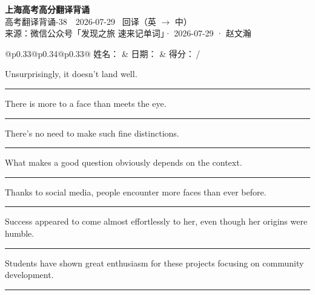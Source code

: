 \documentclass[11pt,a4paper]{article}
\newcommand{\num}[1]{\makebox[1.9em][r]{#1.}\hspace{0.3em}}
\newcommand{\wline}{\noindent\rule{\linewidth}{0.4pt}}
\begin{document}
\pagestyle{plain}
\begin{center}
{\LARGE\bfseries 上海高考高分翻译背诵 }\\[0.25em]
{\large 高考翻译背诵-38　2026-07-29 \quad\ 回译（英 $\to$ 中）}\\[0.35em]
{\footnotesize 来源：微信公众号「发现之旅 速来记单词」· 2026-07-29 · 赵文瀚}
\end{center}

\vspace{0.4em}
\noindent\begin{tabular}{@{}p{0.33\textwidth}@{}p{0.34\textwidth}@{}p{0.33\textwidth}@{}}
姓名：\underline{\hspace{2.0cm}} & 日期：\underline{\hspace{2.0cm}} & 得分：\underline{\hspace{1.4cm}}\,/ \\
\end{tabular}

\vspace{0.5em}

\vspace{0.8em}
\num{1}Unsurprisingly, it doesn't land well.

\vspace{0.25em}

\wline

\num{2}There is more to a face than meets the eye.

\vspace{0.25em}

\wline

\num{3}There's no need to make such fine distinctions.

\vspace{0.25em}

\wline

\num{4}What makes a good question obviously depends on the context.

\vspace{0.25em}

\wline

\num{5}Thanks to social media, people encounter more faces than ever before.

\vspace{0.25em}

\wline

\num{6}Success appeared to come almost effortlessly to her, even though her origins were humble.

\vspace{0.25em}

\wline

\num{7}Students have shown great enthusiasm for these projects focusing on community development.

\vspace{0.25em}

\wline
\end{document}
